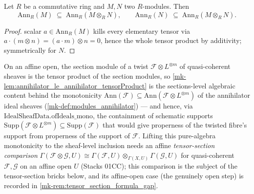 \begin{lemma}\label{mk-lem:annihilator_le_annihilator_tensorProduct}
  \leanok

  Let \(R\) be a commutative ring and \(M, N\) two \(R\)-modules. Then
  \[
    \mathrm{Ann}_R(M) \;\subseteq\; \mathrm{Ann}_R(M \otimes_R N),
    \qquad
    \mathrm{Ann}_R(N) \;\subseteq\; \mathrm{Ann}_R(M \otimes_R N).
  \]
\end{lemma}
\begin{proof}
  \leanokA scalar \(a \in \mathrm{Ann}_R(M)\) kills every elementary tensor via
  \(a \cdot (m \otimes n) = (a \cdot m) \otimes n = 0\), hence the whole tensor
  product by additivity; symmetrically for \(N\).
\end{proof}

\begin{remark}
  \label{mk-rem:annihilator_tensorProduct_support}
  On an affine open, the section module of a twist \(\mathcal F \otimes
  L^{\otimes m}\) of quasi-coherent sheaves is the tensor product of the
  section modules, so \ref{mk-lem:annihilator_le_annihilator_tensorProduct}
  is the sections-level algebraic content behind the monotonicity
  \(\mathrm{Ann}(\mathcal F) \subseteq \mathrm{Ann}(\mathcal F \otimes
  L^{\otimes m})\) of the annihilator ideal sheaves
  (\ref{mk-def:modules_annihilator}) --- and hence, via
  \(\mathrm{IdealSheafData.ofIdeals\_mono}\), the containment of schematic
  supports \(\mathrm{Supp}(\mathcal F \otimes L^{\otimes m}) \subseteq
  \mathrm{Supp}(\mathcal F)\) that would give properness of the twisted
  fibre's support from properness of the support of \(\mathcal F\). Lifting
  this pure-algebra monotonicity to the sheaf-level inclusion needs an
  affine \emph{tensor-section comparison}
  \(\Gamma(\mathcal F \otimes \mathcal G, U) \cong \Gamma(\mathcal F, U)
  \otimes_{\Gamma(X, U)} \Gamma(\mathcal G, U)\) for quasi-coherent
  \(\mathcal F, \mathcal G\) on an affine open \(U\) (Stacks 01CC); this
  comparison is the subject of the tensor-section bricks below, and its
  affine-open case (the genuinely open step) is recorded in
  \ref{mk-rem:tensor_section_formula_gap}.
\end{remark}

